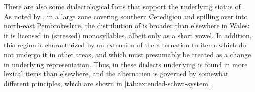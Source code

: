 There are also some dialectological facts that support the underlying status of . As noted by \citet{welshphonotactics,awbery86:_pembr_welsh,wmffre03:_languag_wales}, in a large zone covering southern Ceredigion and spilling over into north-east Pembrokeshire, the distribution of \ipa{[ə]} is broader than elsewhere in Wales: it is licensed in (stressed) monosyllables, albeit only as a short vowel. In addition, this region is characterized by an extension of the alternation to items which do not undergo it in other areas, and which must presumably be treated as a change in underlying representation. Thus, in these dialects underlying \ipa{[ə]} is found in more lexical items than elsewhere, and the alternation is governed by somewhat different principles, which are shown in \cref{tab:extended-schwa-system}.

\begin{table}[htp]
  \centering
{}
  \caption{The \enquote{extended} system contrasted with the standard}
  \label{tab:extended-schwa-system}
\end{table}

